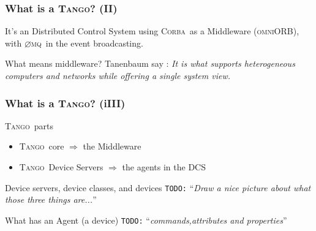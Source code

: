 \documentclass{beamer}
\newcommand{\tango}{\textsc{Tango}}
\newcommand{\corba}{\textsc{Corba}}
\newcommand{\onmiORB}{\textsc{omniORB}}
\newcommand{\zmq}{\textsc{$\varnothing$mq}}
\newcommand{\todo}[1]{\texttt{\color{red}TODO:} ``\emph{#1}''}
\begin{document}
\begin{frame}
\frametitle{What is a \tango? (II)}
    \begin{block}{It's an Distributed Control System}
        using \corba\, as a Middleware (\onmiORB),\\ with \zmq\, in the event broadcasting.
    \end{block}
    \begin{block}{What means middleware?}
        Tanenbaum say \cite{TanenbaumDistr}: \emph{It is what supports heterogeneous computers and networks while offering a single system view.}
    \end{block}
\end{frame}

\begin{frame}
\frametitle{What is a \tango? (iIII)}
    \begin{block}{\tango\, parts}
        \begin{itemize}
            \item \tango\, core $\Rightarrow$ the Middleware
            \item \tango\, Device Servers $\Rightarrow$ the agents in the DCS
        \end{itemize}
    \end{block}
    \begin{exampleblock}{Device servers, device classes, and devices}
        \todo{Draw a nice picture about what those three things are...}
    \end{exampleblock}
    \begin{block}{What has an Agent (a device)}
        \todo{commands,attributes and properties}
    \end{block}
\end{frame}
\end{document}
